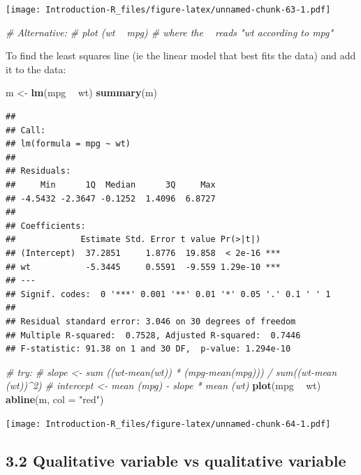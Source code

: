 \documentclass[]{book}
\newenvironment{Shaded}{\begin{snugshade}}{\end{snugshade}}
\newcommand{\CommentTok}[1]{\textcolor[rgb]{0.56,0.35,0.01}{\textit{#1}}}
\newcommand{\DataTypeTok}[1]{\textcolor[rgb]{0.13,0.29,0.53}{#1}}
\newcommand{\KeywordTok}[1]{\textcolor[rgb]{0.13,0.29,0.53}{\textbf{#1}}}
\newcommand{\NormalTok}[1]{#1}
\newcommand{\OperatorTok}[1]{\textcolor[rgb]{0.81,0.36,0.00}{\textbf{#1}}}
\newcommand{\StringTok}[1]{\textcolor[rgb]{0.31,0.60,0.02}{#1}}
\begin{document}
\texttt{[image: Introduction-R\_files/figure-latex/unnamed-chunk-63-1.pdf]}

\begin{Shaded}
\begin{Highlighting}[]
\CommentTok{# Alternative: }
\CommentTok{# plot (wt ~ mpg) # where the ~ reads "wt according to mpg"}
\end{Highlighting}
\end{Shaded}

To find the least squares line (ie the linear model that best fits the data) and add it to the data:

\begin{Shaded}
\begin{Highlighting}[]
\NormalTok{m <-}\StringTok{ }\KeywordTok{lm}\NormalTok{(mpg }\OperatorTok{~}\StringTok{ }\NormalTok{wt)}
\KeywordTok{summary}\NormalTok{(m)}
\end{Highlighting}
\end{Shaded}

\begin{verbatim}
## 
## Call:
## lm(formula = mpg ~ wt)
## 
## Residuals:
##     Min      1Q  Median      3Q     Max 
## -4.5432 -2.3647 -0.1252  1.4096  6.8727 
## 
## Coefficients:
##             Estimate Std. Error t value Pr(>|t|)    
## (Intercept)  37.2851     1.8776  19.858  < 2e-16 ***
## wt           -5.3445     0.5591  -9.559 1.29e-10 ***
## ---
## Signif. codes:  0 '***' 0.001 '**' 0.01 '*' 0.05 '.' 0.1 ' ' 1
## 
## Residual standard error: 3.046 on 30 degrees of freedom
## Multiple R-squared:  0.7528,	Adjusted R-squared:  0.7446 
## F-statistic: 91.38 on 1 and 30 DF,  p-value: 1.294e-10
\end{verbatim}

\begin{Shaded}
\begin{Highlighting}[]
\CommentTok{# try:}
\CommentTok{# slope <- sum ((wt-mean(wt)) * (mpg-mean(mpg))) / sum((wt-mean (wt))^2)}
\CommentTok{# intercept <- mean (mpg) - slope * mean (wt)}
\KeywordTok{plot}\NormalTok{(mpg }\OperatorTok{~}\StringTok{ }\NormalTok{wt)}
\KeywordTok{abline}\NormalTok{(m, }\DataTypeTok{col =} \StringTok{"red"}\NormalTok{)}
\end{Highlighting}
\end{Shaded}

\texttt{[image: Introduction-R\_files/figure-latex/unnamed-chunk-64-1.pdf]}

\hypertarget{qualitative-variable-vs-qualitative-variable}{%
\subsection{3.2 Qualitative variable vs qualitative variable}\label{qualitative-variable-vs-qualitative-variable}}
\end{document}
